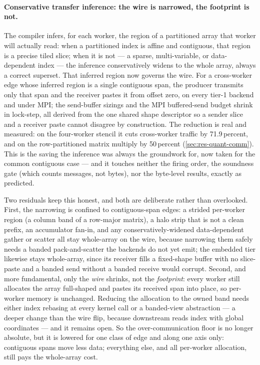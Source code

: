 \paragraph{Conservative transfer inference: the wire is narrowed, the footprint is not.}
The compiler infers, for each worker, the region of a partitioned array that worker
will actually read: when a partitioned index is affine and contiguous, that region
is a precise tiled slice; when it is not --- a sparse, multi-variable, or
data-dependent index --- the inference conservatively widens to the whole array,
always a correct superset. That inferred region now governs the wire. For a
cross-worker edge whose inferred region is a single contiguous span, the producer
transmits only that span and the receiver pastes it from offset zero, on every tier-1
backend and under MPI; the send-buffer sizings and the MPI buffered-send budget shrink
in lock-step, all derived from the one shared shape descriptor so a sender slice and a
receiver paste cannot disagree by construction. The reduction is real and measured: on
the four-worker stencil it cuts cross-worker traffic by 71.9\,percent, and on the
row-partitioned matrix multiply by 50\,percent (\cref{sec:res-quant-comm}). This is the
saving the inference was always the groundwork for, now taken for the common
contiguous case --- and it touches neither the firing order, the soundness gate (which
counts messages, not bytes), nor the byte-level results, exactly as predicted.

Two residuals keep this honest, and both are deliberate rather than overlooked. First,
the narrowing is confined to contiguous-span edges: a strided per-worker region (a
column band of a row-major matrix), a halo strip that is not a clean prefix, an
accumulator fan-in, and any conservatively-widened data-dependent gather or scatter all
stay whole-array on the wire, because narrowing them safely needs a banded
pack-and-scatter the backends do not yet emit; the embedded tier likewise stays
whole-array, since its receiver fills a fixed-shape buffer with no slice-paste and a
banded send without a banded receive would corrupt. Second, and more fundamental, only
the \emph{wire} shrinks, not the \emph{footprint}: every worker still allocates the
array full-shaped and pastes its received span into place, so per-worker memory is
unchanged. Reducing the allocation to the owned band needs either index rebasing at
every kernel call or a banded-view abstraction --- a deeper change than the wire flip,
because downstream reads index with global coordinates --- and it remains open. So the
over-communication floor is no longer absolute, but it is lowered for one class of edge
and along one axis only: contiguous spans move less data; everything else, and all
per-worker allocation, still pays the whole-array cost.


